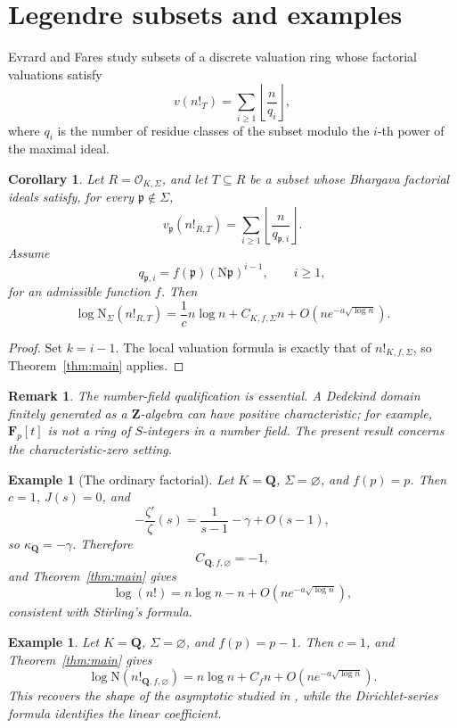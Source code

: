 \documentclass[11pt]{article}
\newtheorem{corollary}[theorem]{Corollary}
\newtheorem{remark}[theorem]{Remark}
\newtheorem{example}[theorem]{Example}
\newcommand{\OKS}{\mathcal O_{K,\Sigma}}
\newcommand{\Norm}{\mathrm N}
\begin{document}
\section{Legendre subsets and examples}

Evrard and Fares \cite{EvrardFares} study subsets of a discrete
valuation ring whose factorial valuations satisfy
\[
v(n!_T)
=
\sum_{i\ge1}
\left\lfloor\frac{n}{q_i}\right\rfloor,
\]
where \(q_i\) is the number of residue classes of the subset modulo the
\(i\)-th power of the maximal ideal.

\begin{corollary}\label{cor:legendre}
Let \(R=\OKS\), and let \(T\subseteq R\) be a subset whose Bhargava
factorial ideals satisfy, for every \(\mathfrak p\notin\Sigma\),
\[
v_{\mathfrak p}(n!_{R,T})
=
\sum_{i\ge1}
\left\lfloor
\frac{n}{q_{\mathfrak p,i}}
\right\rfloor.
\]
Assume
\[
q_{\mathfrak p,i}
=
f(\mathfrak p)(\Norm\mathfrak p)^{i-1},
\qquad i\ge1,
\]
for an admissible function \(f\).  Then
\[
\log\Norm_\Sigma(n!_{R,T})
=
\frac1c n\log n
+
C_{K,f,\Sigma}n
+
O\!\left(
ne^{-a\sqrt{\log n}}
\right).
\]
\end{corollary}

\begin{proof}
Set \(k=i-1\).  The local valuation formula is exactly that of
\(n!_{K,f,\Sigma}\), so Theorem~\ref{thm:main} applies.
\end{proof}

\begin{remark}
The number-field qualification is essential.  A Dedekind domain
finitely generated as a \(\mathbf Z\)-algebra can have positive
characteristic; for example, \(\mathbf F_p[t]\) is not a ring of
\(S\)-integers in a number field.  The present result concerns the
characteristic-zero setting.
\end{remark}

\begin{example}[The ordinary factorial]
Let \(K=\mathbf Q\), \(\Sigma=\varnothing\), and \(f(p)=p\).  Then
\(c=1\), \(J(s)=0\), and
\[
-\frac{\zeta'}{\zeta}(s)
=
\frac1{s-1}-\gamma+O(s-1),
\]
so \(\kappa_{\mathbf Q}=-\gamma\).  Therefore
\[
C_{\mathbf Q,f,\varnothing}=-1,
\]
and Theorem~\ref{thm:main} gives
\[
\log(n!)
=
n\log n-n
+
O\!\left(
ne^{-a\sqrt{\log n}}
\right),
\]
consistent with Stirling's formula.
\end{example}

\begin{example}
Let \(K=\mathbf Q\), \(\Sigma=\varnothing\), and \(f(p)=p-1\).  Then
\(c=1\), and Theorem~\ref{thm:main} gives
\[
\log\Norm(n!_{\mathbf Q,f,\varnothing})
=
n\log n
+
C_f n
+
O\!\left(
ne^{-a\sqrt{\log n}}
\right).
\]
This recovers the shape of the asymptotic studied in
\cite{DiazLegendre}, while the Dirichlet-series formula identifies the
linear coefficient.
\end{example}
\end{document}
